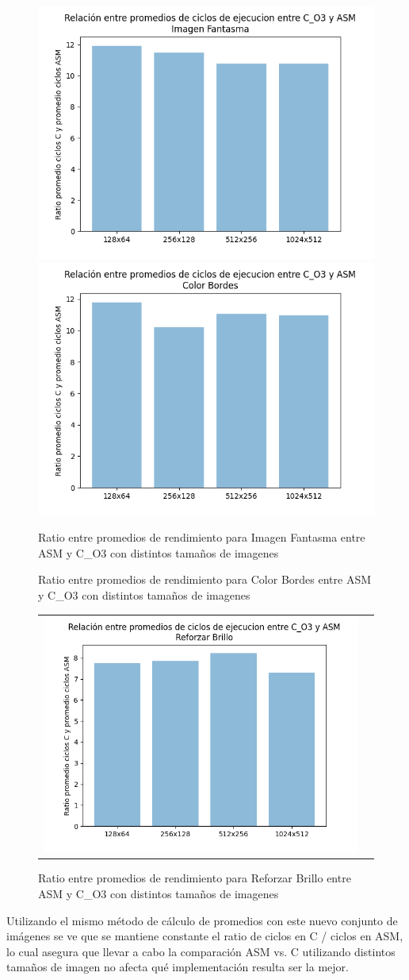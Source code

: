 \begin{figure}[h]
    \centering
        \includegraphics[width=0.5\linewidth]{img/RelacionASMCImagenFantasma.png}\hfil
        \includegraphics[width=0.5\linewidth]{img/RelacionASMCColorBordes.png}\par\medskip
        \caption{Ratio entre promedios de rendimiento para Imagen Fantasma entre ASM y C_O3 con distintos tamaños de imagenes}
        \caption{Ratio entre promedios de rendimiento para Color Bordes entre ASM y C_O3 con distintos tamaños de imagenes}
    \end{figure}
    
    \begin{figure}[h]
    \centering
    \begin{tabular}{cc}
        \includegraphics[width=0.5\linewidth]{img/RelacionASMCReforzarBrillo.png}&
    \end{tabular}
    \caption{Ratio entre promedios de rendimiento para Reforzar Brillo entre ASM y C_O3 con distintos tamaños de imagenes}
\end{figure}
\par Utilizando el mismo método de cálculo de promedios con este nuevo conjunto de imágenes se ve que se mantiene constante el ratio de ciclos en C / ciclos en ASM, lo cual asegura que llevar a cabo 
la comparación ASM vs. C utilizando distintos tamaños de imagen no afecta qué implementación resulta ser la mejor.